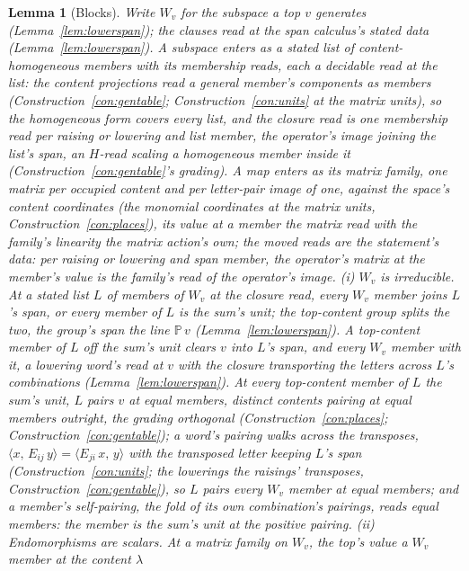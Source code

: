\documentclass[11pt]{article}
\newtheorem{lemma}{Lemma}
\theoremstyle{definition}
\begin{document}
\begin{lemma}[Blocks]\label{lem:blockirr}
Write $W_v$ for the subspace a top $v$ generates
(Lemma~\ref{lem:lowerspan}); the clauses read at the span
calculus's stated data (Lemma~\ref{lem:lowerspan}). A subspace
enters as a stated list of content-homogeneous members with its
membership reads, each a decidable read at the list: the content
projections read a general member's components as members
(Construction~\ref{con:gentable}; Construction~\ref{con:units} at
the matrix units), so the homogeneous form covers every list, and
the \emph{closure read} is one membership read per raising or
lowering and list member, the operator's image joining the list's
span, an $H$-read scaling a homogeneous member inside it
(Construction~\ref{con:gentable}'s grading). A map enters as its
\emph{matrix family}, one matrix per occupied content and per
letter-pair image of one, against the space's content coordinates
(the monomial coordinates at the matrix units,
Construction~\ref{con:places}), its value at a member the matrix
read with the family's linearity the matrix action's own; the
\emph{moved reads} are the statement's data: per raising or
lowering and span member, the operator's matrix at the member's
value is the family's read of the operator's image.
\emph{(i) $W_v$ is irreducible.} At a stated list $L$ of members
of $W_v$ at the closure read, every $W_v$ member joins $L$'s
span, or every member of $L$ is the sum's unit; the top-content
group splits the two, the group's span the line $\mathbb P\,v$
(Lemma~\ref{lem:lowerspan}). A top-content member of $L$ off the
sum's unit clears $v$ into $L$'s span, and every $W_v$ member
with it, a lowering word's read at $v$ with the closure
transporting the letters across $L$'s combinations
(Lemma~\ref{lem:lowerspan}). At every top-content member of $L$
the sum's unit, $L$ pairs $v$ at equal members, distinct contents
pairing at equal members outright, the grading orthogonal
(Construction~\ref{con:places}; Construction~\ref{con:gentable});
a word's pairing walks across the transposes,
$\langle x,\,E_{ij}\,y\rangle=\langle E_{ji}\,x,\,y\rangle$ with
the transposed letter keeping $L$'s span
(Construction~\ref{con:units}; the lowerings the raisings'
transposes, Construction~\ref{con:gentable}), so $L$ pairs every
$W_v$ member at equal members; and a member's self-pairing, the
fold of its own combination's pairings, reads equal members: the
member is the sum's unit at the positive pairing.
\emph{(ii) Endomorphisms are scalars.} At a matrix family on
$W_v$, the top's value a $W_v$ member at the content $\lambda$

\end{lemma}
\end{document}

